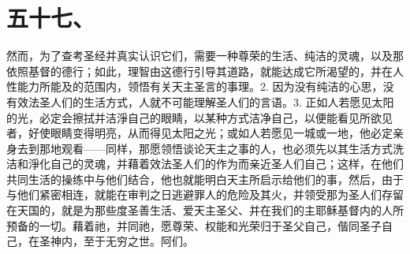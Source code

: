 
\section{五十七、}

然而，为了查考圣经并真实认识它们，需要一种尊荣的生活、纯洁的灵魂，以及那依照基督的德行；如此，理智由这德行引导其道路，就能达成它所渴望的，并在人性能力所能及的范围内，领悟有关天主圣言的事理。2. 因为没有纯洁的心思，没有效法圣人们的生活方式，人就不可能理解圣人们的言语。3. 正如人若愿见太阳的光，必定会擦拭并洁淨自己的眼睛，以某种方式洁净自己，以便能看见所欲见者，好使眼睛变得明亮，从而得见太阳之光；或如人若愿见一城或一地，他必定亲身去到那地观看——同样，那愿领悟谈论天主之事的人，也必须先以其生活方式洗洁和淨化自己的灵魂，并藉着效法圣人们的作为而亲近圣人们自己；这样，在他们共同生活的操练中与他们结合，他也就能明白天主所启示给他们的事，然后，由于与他们紧密相连，就能在审判之日逃避罪人的危险及其火，并领受那为圣人们存留在天国的，就是为那些度圣善生活、爱天主圣父、并在我们的主耶稣基督内的人所预备的一切。藉着祂，并同祂，愿尊荣、权能和光荣归于圣父自己，偕同圣子自己，在圣神内，至于无穷之世。阿们。\par


